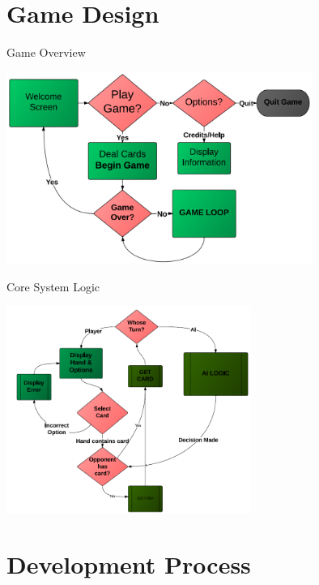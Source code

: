 \documentclass[compress, blue]{beamer}
\begin{document}
\section{Game Design}

\begin{frame}{Game Overview}
\begin{center}
\includegraphics[width=10cm]{Overview.PNG}
\end{center}
\end{frame}

\begin{frame}{Core System Logic}
\begin{center}
\includegraphics[width=8cm]{CoreLogic.PNG}
\end{center}
\end{frame}



\section{Development Process}
\end{document}
